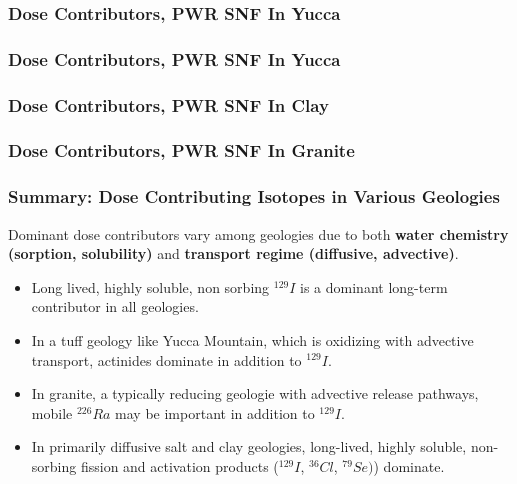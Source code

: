 
\begin{frame}[ctb!]
  \frametitle{Dose Contributors, PWR SNF In Yucca}
\footnotesize{
  
}
\end{frame}

\begin{frame}[ctb!]
  \frametitle{Dose Contributors, PWR SNF In Yucca}
\footnotesize{
  
}
\end{frame}

\begin{frame}[ctb!]
  \frametitle{Dose Contributors, PWR SNF In Clay}
\footnotesize{
  
}
\end{frame}

\begin{frame}[ctb!]
  \frametitle{Dose Contributors, PWR SNF In Granite}
\footnotesize{
  
}
\end{frame}

\begin{frame}[ctb!]
  \frametitle{Summary: Dose Contributing Isotopes in Various Geologies}
\footnotesize{
Dominant dose contributors vary among geologies due to both \textbf{water chemistry (sorption, solubility)} and \textbf{transport regime (diffusive, advective)}. 
\begin{itemize}
  \item Long lived, highly soluble, non sorbing $^{129}I$ is a dominant long-term
contributor in all geologies.
  \item In a tuff geology like Yucca Mountain, which is oxidizing with advective transport, actinides dominate in addition to $^{129}I$.
  \item In granite, a typically reducing geologie with advective release pathways, mobile $^{226}Ra$ may be important in addition to $^{129}I$.
  \item In primarily diffusive salt and clay geologies, long-lived, highly soluble, non-sorbing fission and activation products ($^{129}I$, $^{36}Cl$, $^{79}Se)$)  dominate. 
\end{itemize}
}
\end{frame}
